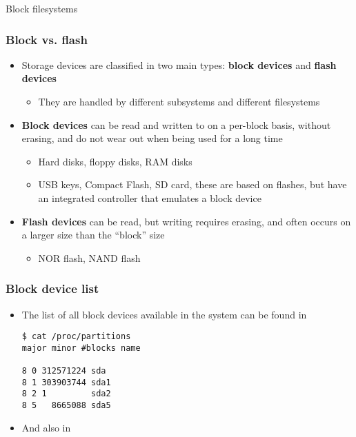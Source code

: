 \chapterframe
{Block filesystems}

\begin{frame}
  \frametitle{Block vs. flash}
  \begin{itemize}
  \item Storage devices are classified in two main types: {\bf block
      devices} and {\bf flash devices}
    \begin{itemize}
    \item They are handled by different subsystems and different
      filesystems
    \end{itemize}
  \item {\bf Block devices} can be read and written to on a per-block
    basis, without erasing, and do not wear out when being used for a
    long time
    \begin{itemize}
    \item Hard disks, floppy disks, RAM disks
    \item USB keys, Compact Flash, SD card, these are based on
      flashes, but have an integrated controller that emulates a block
      device
    \end{itemize}
  \item {\bf Flash devices} can be read, but writing requires erasing,
    and often occurs on a larger size than the “block” size
    \begin{itemize}
    \item NOR flash, NAND flash
    \end{itemize}
  \end{itemize}
\end{frame}

\begin{frame}[fragile]
  \frametitle{Block device list}
  \begin{itemize}
  \item The list of all block devices available in the system can be
    found in \\
\begin{verbatim}
$ cat /proc/partitions
major minor #blocks name

8 0 312571224 sda
8 1 303903744 sda1
8 2 1         sda2
8 5   8665088 sda5
\end{verbatim}
  \item And also in 
  \end{itemize}
\end{frame}

